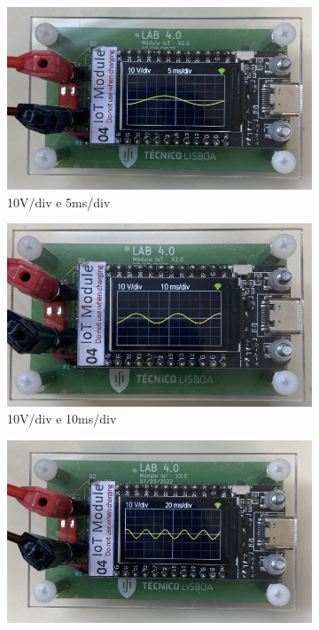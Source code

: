 \begin{figure}[H]
    \centering
    \begin{subfigure}{0.35\textwidth}
        \centering
        \includegraphics[width=1\linewidth]{Imagens/Testes no laboratório/Não calibrado/Horizontal 5ms.png}
        \captionsetup{justification=centering}
        \caption{10V/div e 5ms/div}
        \label{fig:10V/div e 5ms/div não calibrado}
    \end{subfigure}
    \begin{subfigure}{0.35\textwidth}
        \centering
        \includegraphics[width=1\linewidth]{Imagens/Testes no laboratório/Não calibrado/Horizontal 10ms.png}
        \captionsetup{justification=centering}
        \caption{10V/div e 10ms/div}
        \label{fig:10V/div e 10ms/div não calibrado}
    \end{subfigure}
    \begin{subfigure}{0.35\textwidth}
        \centering
        \includegraphics[width=1\linewidth]{Imagens/Testes no laboratório/Não calibrado/Horizontal 20ms.png}

\end{subfigure}
\end{figure}
